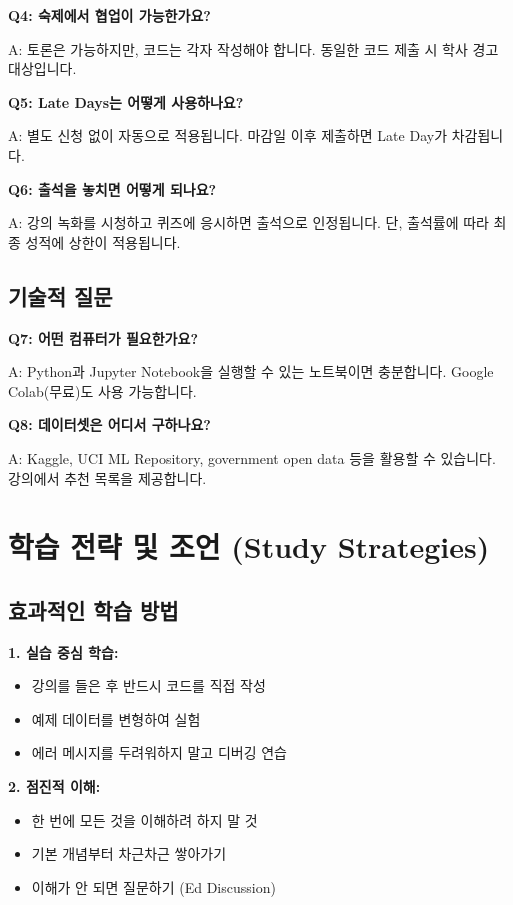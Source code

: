 \documentclass[12pt,a4paper]{article}
\begin{document}
\textbf{Q4: 숙제에서 협업이 가능한가요?}

A: 토론은 가능하지만, 코드는 각자 작성해야 합니다. 동일한 코드 제출 시 학사 경고 대상입니다.

\textbf{Q5: Late Days는 어떻게 사용하나요?}

A: 별도 신청 없이 자동으로 적용됩니다. 마감일 이후 제출하면 Late Day가 차감됩니다.

\textbf{Q6: 출석을 놓치면 어떻게 되나요?}

A: 강의 녹화를 시청하고 퀴즈에 응시하면 출석으로 인정됩니다. 단, 출석률에 따라 최종 성적에 상한이 적용됩니다.

\subsection{기술적 질문}

\textbf{Q7: 어떤 컴퓨터가 필요한가요?}

A: Python과 Jupyter Notebook을 실행할 수 있는 노트북이면 충분합니다. Google Colab(무료)도 사용 가능합니다.

\textbf{Q8: 데이터셋은 어디서 구하나요?}

A: Kaggle, UCI ML Repository, government open data 등을 활용할 수 있습니다. 강의에서 추천 목록을 제공합니다.

\section{학습 전략 및 조언 (Study Strategies)}

\subsection{효과적인 학습 방법}

\textbf{1. 실습 중심 학습:}
\begin{itemize}
    \item 강의를 들은 후 반드시 코드를 직접 작성
    \item 예제 데이터를 변형하여 실험
    \item 에러 메시지를 두려워하지 말고 디버깅 연습
\end{itemize}

\textbf{2. 점진적 이해:}
\begin{itemize}
    \item 한 번에 모든 것을 이해하려 하지 말 것
    \item 기본 개념부터 차근차근 쌓아가기
    \item 이해가 안 되면 질문하기 (Ed Discussion)
\end{itemize}
\end{document}
